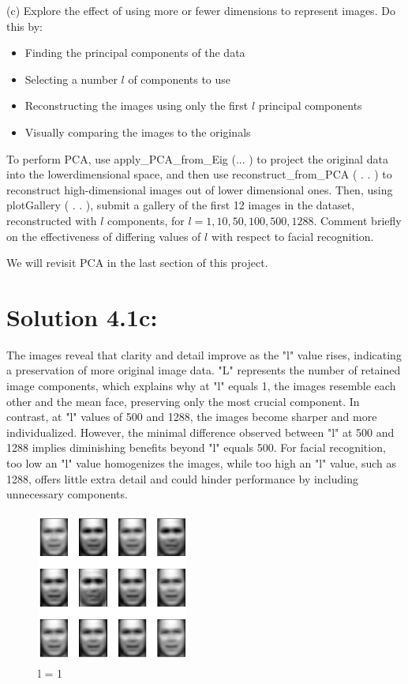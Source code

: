 \documentclass[10pt]{article}
\begin{document}
(c) Explore the effect of using more or fewer dimensions to represent images. Do this by:

\begin{itemize}
  \item Finding the principal components of the data
  \item Selecting a number $l$ of components to use
  \item Reconstructing the images using only the first $l$ principal components
  \item Visually comparing the images to the originals
\end{itemize}

To perform PCA, use apply\_PCA\_from\_Eig (... ) to project the original data into the lowerdimensional space, and then use reconstruct\_from\_PCA ( . . ) to reconstruct high-dimensional images out of lower dimensional ones. Then, using plotGallery ( . . ), submit a gallery of the first 12 images in the dataset, reconstructed with $l$ components, for $l=1,10,50,100,500,1288$. Comment briefly on the effectiveness of differing values of $l$ with respect to facial recognition.

We will revisit PCA in the last section of this project.

\section*{Solution 4.1c:}

The images reveal that clarity and detail improve as the "l" value rises, indicating a preservation of more original image data. "L" represents the number of retained image components, which explains why at "l" equals 1, the images resemble each other and the mean face, preserving only the most crucial component. In contrast, at "l" values of 500 and 1288, the images become sharper and more individualized. However, the minimal difference observed between "l" at 500 and 1288 implies diminishing benefits beyond "l" equals 500. For facial recognition, too low an "l" value homogenizes the images, while too high an "l" value, such as 1288, offers little extra detail and could hinder performance by including unnecessary components. \\

\begin{figure}[H]
  \centering
  \includegraphics[width=5cm, height=5cm]{images/4.1c_1.png}
  \caption{l = 1}
  \label{fig:faces}
\end{figure}
\end{document}
